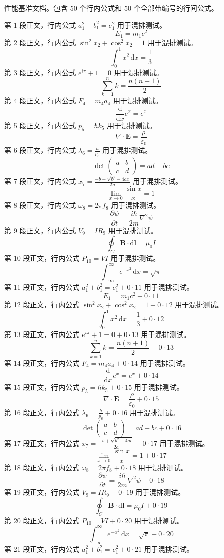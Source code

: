 性能基准文档。包含 50 个行内公式和 50 个全部带编号的行间公式。

第 1 段正文，行内公式 $a_1^2+b_1^2=c_1^2$ 用于混排测试。
$$E_1=m_1c^2$$
第 2 段正文，行内公式 $\sin^2 x_2+\cos^2 x_2=1$ 用于混排测试。
$$\int_0^1 x^2\,\mathrm{d}x=\frac13$$
第 3 段正文，行内公式 $e^{i\pi}+1=0$ 用于混排测试。
$$\sum_{k=1}^{n} k=\frac{n(n+1)}2$$
第 4 段正文，行内公式 $F_4=m_4a_4$ 用于混排测试。
$$\frac{\mathrm{d}}{\mathrm{d}x}e^x=e^x$$
第 5 段正文，行内公式 $p_5=\hbar k_5$ 用于混排测试。
$$\nabla\cdot\mathbf{E}=\frac{\rho}{\varepsilon_0}$$
第 6 段正文，行内公式 $\lambda_6=\frac{h}{p_6}$ 用于混排测试。
$$\det\begin{pmatrix}a&b\\c&d\end{pmatrix}=ad-bc$$
第 7 段正文，行内公式 $x_7=\frac{-b+\sqrt{b^2-4ac}}{2a}$ 用于混排测试。
$$\lim_{x\to0}\frac{\sin x}{x}=1$$
第 8 段正文，行内公式 $\omega_8=2\pi f_8$ 用于混排测试。
$$\frac{\partial \psi}{\partial t}=\frac{i\hbar}{2m}\nabla^2\psi$$
第 9 段正文，行内公式 $V_9=IR_9$ 用于混排测试。
$$\oint_C \mathbf{B}\cdot\mathrm{d}\mathbf{l}=\mu_0 I$$
第 10 段正文，行内公式 $P_{10}=VI$ 用于混排测试。
$$\int_{-\infty}^{\infty}e^{-x^2}\,\mathrm{d}x=\sqrt{\pi}$$
第 11 段正文，行内公式 $a_1^2+b_1^2=c_1^2+0\cdot11$ 用于混排测试。
$$E_1=m_1c^2+0\cdot11$$
第 12 段正文，行内公式 $\sin^2 x_2+\cos^2 x_2=1+0\cdot12$ 用于混排测试。
$$\int_0^1 x^2\,\mathrm{d}x=\frac13+0\cdot12$$
第 13 段正文，行内公式 $e^{i\pi}+1=0+0\cdot13$ 用于混排测试。
$$\sum_{k=1}^{n} k=\frac{n(n+1)}2+0\cdot13$$
第 14 段正文，行内公式 $F_4=m_4a_4+0\cdot14$ 用于混排测试。
$$\frac{\mathrm{d}}{\mathrm{d}x}e^x=e^x+0\cdot14$$
第 15 段正文，行内公式 $p_5=\hbar k_5+0\cdot15$ 用于混排测试。
$$\nabla\cdot\mathbf{E}=\frac{\rho}{\varepsilon_0}+0\cdot15$$
第 16 段正文，行内公式 $\lambda_6=\frac{h}{p_6}+0\cdot16$ 用于混排测试。
$$\det\begin{pmatrix}a&b\\c&d\end{pmatrix}=ad-bc+0\cdot16$$
第 17 段正文，行内公式 $x_7=\frac{-b+\sqrt{b^2-4ac}}{2a}+0\cdot17$ 用于混排测试。
$$\lim_{x\to0}\frac{\sin x}{x}=1+0\cdot17$$
第 18 段正文，行内公式 $\omega_8=2\pi f_8+0\cdot18$ 用于混排测试。
$$\frac{\partial \psi}{\partial t}=\frac{i\hbar}{2m}\nabla^2\psi+0\cdot18$$
第 19 段正文，行内公式 $V_9=IR_9+0\cdot19$ 用于混排测试。
$$\oint_C \mathbf{B}\cdot\mathrm{d}\mathbf{l}=\mu_0 I+0\cdot19$$
第 20 段正文，行内公式 $P_{10}=VI+0\cdot20$ 用于混排测试。
$$\int_{-\infty}^{\infty}e^{-x^2}\,\mathrm{d}x=\sqrt{\pi}+0\cdot20$$
第 21 段正文，行内公式 $a_1^2+b_1^2=c_1^2+0\cdot21$ 用于混排测试。
